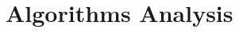 \section{Algorithms Analysis}
\label{sec:algorithms}
    
    \newpage
    
    \newpage
    
    \newpage
    
    \newpage
    